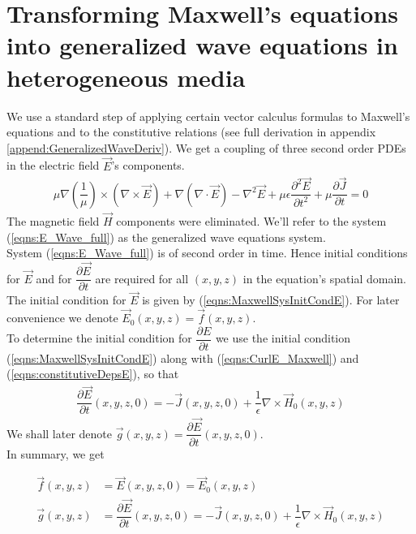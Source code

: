 \documentclass[12pt,twoside]{report}
\begin{document}
\section{Transforming Maxwell's equations into generalized wave equations in heterogeneous media}
\label{sec:TransMaxwellToWave}


We use a standard step of applying certain vector calculus formulas to Maxwell's equations and to the constitutive relations (see full derivation in appendix \ref{append:GeneralizedWaveDeriv}). We get a coupling of three second order PDEs in the electric field $\overrightarrow{E}$'s components. 
\begin{align}
\label{eqns:E_Wave_full}
\mu \nabla \left( \dfrac{1}{\mu} \right) \times \left(\nabla \times \overrightarrow{E} \right) +  \nabla (\nabla \cdot \overrightarrow{E}) - \nabla^2 \overrightarrow{E} + \mu \epsilon\dfrac{\partial^2 \overrightarrow{E}}{\partial t^2} + \mu \dfrac{\partial \overrightarrow{J}}{\partial t} = 0
\end{align}
The magnetic field $\overrightarrow{H}$ components were eliminated. We'll refer to the system (\ref{eqns:E_Wave_full}) as the generalized wave equations system.\\
System (\ref{eqns:E_Wave_full}) is of second order in time. Hence initial conditions for $\overrightarrow{E}$ and for $\dfrac{\partial \overrightarrow{E}}{\partial t}$ are required for all $(x,y,z)$ in the equation's spatial domain. The initial condition for $\overrightarrow{E}$ is given by (\ref{eqns:MaxwellSysInitCondE}). For later convenience we denote $\overrightarrow{E}_0(x,y,z) = \overrightarrow{f}(x,y,z)$. \\
To determine the initial condition for $\dfrac{\partial E}{\partial t}$ we use the initial condition (\ref{eqns:MaxwellSysInitCondE}) along with 
(\ref{eqns:CurlE_Maxwell}) and (\ref{eqns:constitutiveDepsE}), so that
\begin{align*}
\dfrac{\partial \overrightarrow{E}}{\partial t}(x,y,z,0) = -\overrightarrow{J}(x,y,z,0) + \dfrac{1}{\epsilon} \nabla \times \overrightarrow{H}_0(x,y,z)
\end{align*}
We shall later denote $\overrightarrow{g}(x,y,z) =  \dfrac{\partial \overrightarrow{E}}{\partial t}(x,y,z,0)$.\\

In summary, we get

\begin{subequations}
\begin{align}
\label{eqns:GeneralizedWaveEqInitCondsE}
\overrightarrow{f}(x,y,z) &= \overrightarrow{E}(x,y,z,0) = \overrightarrow{E}_0(x,y,z)	\\
\label{eqns:GeneralizedWaveEqInitCondsDEDT}
\overrightarrow{g}(x,y,z) &=\dfrac{\partial \overrightarrow{E}}{\partial t}(x,y,z,0) = -\overrightarrow{J}(x,y,z,0) + \dfrac{1}{\epsilon} \nabla \times \overrightarrow{H}_0(x,y,z)
\end{align}
\end{subequations}
\end{document}
